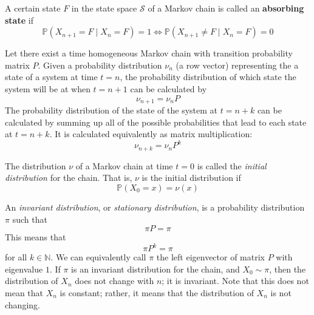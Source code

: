 \documentclass{article}
\begin{document}
    \begin{definition}
      A certain state $F$ in the state space $\mathcal{S}$ of a Markov chain is called an \textbf{absorbing state} if
      \begin{equation}
        \mathbb{P}(X_{n+1} = F \; | \; X_n = F) = 1 \iff \mathbb{P}(X_{n+1} \neq F \; | \; X_n = F) = 0
      \end{equation}
    \end{definition}

    \begin{theorem}
      Let there exist a time homogeneous Markov chain with transition probability matrix $P$. Given a probability distribution $\nu_n$ (a row vector) representing the a state of a system at time $t=n$, the probability distribution of which state the system will be at when $t=n+1$ can be calculated by 
      \begin{equation}
        \nu_{n+1} = \nu_n P
      \end{equation}
      The probability distribution of the state of the system at $t=n+k$ can be calculated by summing up all of the possible probabilities that lead to each state at $t=n+k$. It is calculated equivalently as matrix multiplication: 
      \begin{equation}
        \nu_{n+k} = \nu_n P^k
      \end{equation}
    \end{theorem}

    \begin{definition}
      The distribution $\nu$ of a Markov chain at time $t=0$ is called the \textit{initial distribution} for the chain. That is, $\nu$ is the initial distribution if 
      \begin{equation}
        \mathbb{P}(X_0 = x) = \nu(x)
      \end{equation}
    \end{definition}

    \begin{definition}
      An \textit{invariant distribution}, or \textit{stationary distribution}, is a probability distribution $\pi$ such that 
      \begin{equation}
        \pi P = \pi
      \end{equation}
      This means that 
      \begin{equation}
        \pi P^k = \pi
      \end{equation}
      for all $k \in \mathbb{N}$. We can equivalently call $\pi$ the left eigenvector of matrix $P$ with eigenvalue $1$. If $\pi$ is an invariant distribution for the chain, and $X_0 \sim \pi$, then the distribution of $X_n$ does not change with $n$; it is invariant. Note that this does not mean that $X_n$ is constant; rather, it means that the distribution of $X_n$ is not changing. 
    \end{definition}
\end{document}
